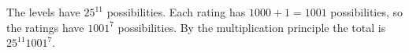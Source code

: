 The levels have $25^{11}$ possibilities. Each rating has $1000+1=1001$ possibilities, so the ratings have $1001^7$ possibilities. By the multiplication principle the total is $\boxed{25^{11}1001^7}$.
